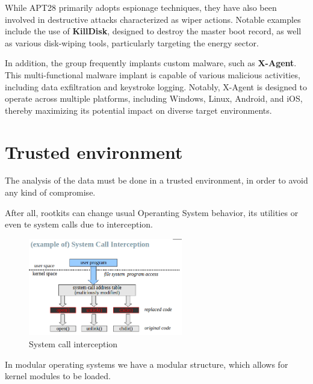 While APT28 primarily adopts espionage techniques, they have also been
involved in destructive attacks characterized as wiper actions.
Notable examples include the use of \textbf{KillDisk}, designed to
destroy the master boot record, as well as various disk-wiping tools,
particularly targeting the energy sector.

In addition, the group frequently implants custom malware, such as
\textbf{X-Agent}. This multi-functional malware implant is capable of
various malicious activities, including data exfiltration and
keystroke logging. Notably, X-Agent is designed to operate across
multiple platforms, including Windows, Linux, Android, and iOS,
thereby maximizing its potential impact on diverse target
environments.
\section{Trusted environment}

\begin{boxH}
  The analysis of the data must be done in a trusted environment, in 
  order to avoid any kind of compromise. 
\end{boxH}
After all, rootkits can change usual Operanting System behavior, its
utilities or even te system calls due to interception.
\begin{figure}[h]
  \centering
  \includegraphics[width=0.6\textwidth]{img/scall interception.png}
  \caption{System call interception}
\end{figure}
In modular operating systems we have a modular structure, which allows
for kernel modules to be loaded.
